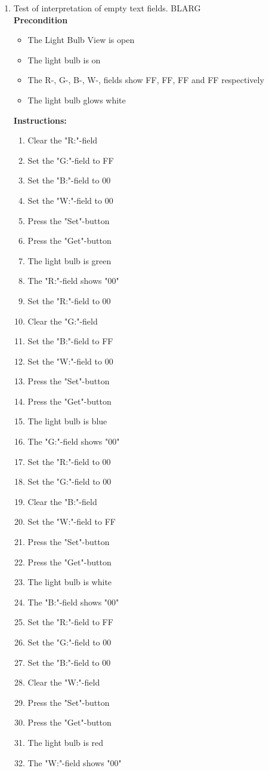 \documentclass[a4paper]{article}
\newlength{\testlabellength}
\newenvironment{testlist}{\begin{enumerate}[label=\bfseries Instruction \thesubsection.\arabic* , labelindent=0pt, labelwidth=\testlabellength , leftmargin=2cm]}{\end{enumerate}}
\newenvironment{precondition}{
{\color{white}BLARG}\\ 
\textbf{Precondition}
\begin{itemize}[labelindent=0cm, labelwidth=2cm , leftmargin=1cm]
}
{\end{itemize}}
\newenvironment{instruction}{
\textbf{Instructions:}
\begin{enumerate}[label=\bfseries  \arabic*., labelindent=0cm, labelwidth=2cm , leftmargin=1cm]
}
{\end{enumerate}}
\begin{document}
\begin{appendices}
\begin{testlist}
	\item Test of interpretation of empty text fields.
		\begin{precondition}
			\item The Light Bulb View is open
			\item The light bulb is on
			\item The R-, G-, B-, W-, fields show FF, FF, FF and FF respectively
			\item The light bulb glows white
		\end{precondition}
		\begin{instruction}
			\item Clear the "R:"-field
			\item Set the "G:"-field to FF
			\item Set the "B:"-field to 00
			\item Set the "W:"-field to 00

			\item Press the "Set"-button
			\item Press the "Get"-button
			\item The light bulb is green
			\item The "R:"-field shows "00"
			
			\item Set the "R:"-field to 00
			\item Clear the "G:"-field
			\item Set the "B:"-field to FF
			\item Set the "W:"-field to 00
			\item Press the "Set"-button
			\item Press the "Get"-button
			\item The light bulb is blue
			\item The "G:"-field shows "00"
			
			\item Set the "R:"-field to 00
			\item Set the "G:"-field to 00
			\item Clear the "B:"-field
			\item Set the "W:"-field to FF
			\item Press the "Set"-button
			\item Press the "Get"-button
			\item The light bulb is white
			\item The "B:"-field shows "00"
			
			\item Set the "R:"-field to FF
			\item Set the "G:"-field to 00
			\item Set the "B:"-field to 00
			\item Clear the "W:"-field
			\item Press the "Set"-button
			\item Press the "Get"-button
			\item The light bulb is red
			\item The "W:"-field shows "00"
		\end{instruction}


\end{testlist}
\end{appendices}
\end{document}

